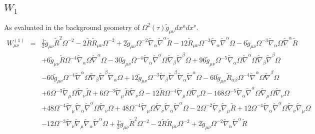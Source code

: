 \documentclass[10pt,letterpaper]{article}
\numberwithin{equation}{section}
\begin{document}
\subsection{$W_1$}
As evaluated in the background geometry of $\Omega^2(\tau)\tilde g_{\mu\nu}dx^\mu dx^\nu$.
\begin{eqnarray}
W^{(1)}_{\mu\nu}&=& \tfrac{1}{2} \tilde g_{\mu \nu } \tilde R^2 \Omega^{-2} - 2 \tilde R \tilde R_{\mu \nu } \Omega^{-2} + 2 \tilde g_{\mu \nu } \Omega^{-2} \tilde\nabla_{\alpha }\tilde\nabla^{\alpha }\tilde R - 12 \tilde R_{\mu \nu } \Omega^{-3} \tilde\nabla_{\alpha }\tilde\nabla^{\alpha }\Omega - 6 \tilde g_{\mu \nu } \Omega^{-3} \tilde\nabla_{\alpha }\Omega \tilde\nabla^{\alpha }\tilde R \nonumber \\ 
&& + 6 \tilde g_{\mu \nu } \tilde R \Omega^{-4} \tilde\nabla_{\alpha }\Omega \tilde\nabla^{\alpha }\Omega - 30 \tilde g_{\mu \nu } \Omega^{-4} \tilde\nabla_{\alpha }\tilde\nabla^{\alpha }\Omega \tilde\nabla_{\beta }\tilde\nabla^{\beta }\Omega + 96 \tilde g_{\mu \nu } \Omega^{-5} \tilde\nabla_{\alpha }\Omega \tilde\nabla^{\alpha }\Omega \tilde\nabla_{\beta }\tilde\nabla^{\beta }\Omega \nonumber \\ 
&& - 60 \tilde g_{\mu \nu } \Omega^{-4} \tilde\nabla^{\alpha }\Omega \tilde\nabla_{\beta }\tilde\nabla^{\beta }\tilde\nabla_{\alpha }\Omega + 12 \tilde g_{\mu \nu } \Omega^{-3} \tilde\nabla_{\beta }\tilde\nabla^{\beta }\tilde\nabla_{\alpha }\tilde\nabla^{\alpha }\Omega - 60 \tilde g_{\mu \nu } \tilde R_{\alpha \beta } \Omega^{-4} \tilde\nabla^{\alpha }\Omega \tilde\nabla^{\beta }\Omega \nonumber \\ 
&& + 6 \Omega^{-3} \tilde\nabla_{\mu }\Omega \tilde\nabla_{\nu }\tilde R + 6 \Omega^{-3} \tilde\nabla_{\mu }\tilde R \tilde\nabla_{\nu }\Omega - 12 \tilde R \Omega^{-4} \tilde\nabla_{\mu }\Omega \tilde\nabla_{\nu }\Omega - 168 \Omega^{-5} \tilde\nabla_{\alpha }\tilde\nabla^{\alpha }\Omega \tilde\nabla_{\mu }\Omega \tilde\nabla_{\nu }\Omega \nonumber \\ 
&& + 48 \Omega^{-4} \tilde\nabla_{\mu }\tilde\nabla_{\alpha }\tilde\nabla^{\alpha }\Omega \tilde\nabla_{\nu }\Omega + 48 \Omega^{-4} \tilde\nabla_{\mu }\Omega \tilde\nabla_{\nu }\tilde\nabla_{\alpha }\tilde\nabla^{\alpha }\Omega - 2 \Omega^{-2} \tilde\nabla_{\nu }\tilde\nabla_{\mu }\tilde R + 12 \Omega^{-4} \tilde\nabla_{\alpha }\tilde\nabla^{\alpha }\Omega \tilde\nabla_{\nu }\tilde\nabla_{\mu }\Omega \nonumber \\ 
&& - 12 \Omega^{-3} \tilde\nabla_{\nu }\tilde\nabla_{\mu }\tilde\nabla_{\alpha }\tilde\nabla^{\alpha }\Omega +\tfrac{1}{2} \tilde g_{\mu \nu } \tilde R^2 \Omega^{-2} - 2 \tilde R \tilde R_{\mu \nu } \Omega^{-2} + 2 \tilde g_{\mu \nu } \Omega^{-2} \tilde\nabla_{\alpha }\tilde\nabla^{\alpha }\tilde R \nonumber \\ 

\end{eqnarray}
\end{document}
